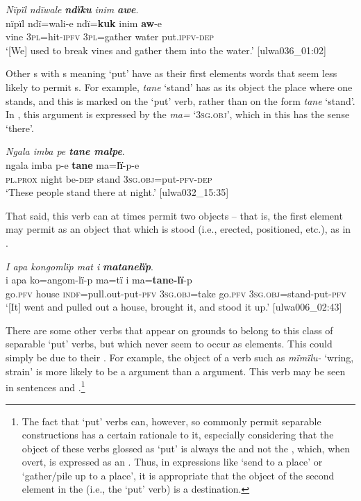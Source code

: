 \ea%
    \label{ex:phrase:83}
         \textit{Nïpïl ndïwale} \textbf{\textit{ndïku}} \textit{inim} \textbf{\textit{awe}}.\\
\gll nïpïl  ndï=wali-e    ndï=\textbf{kuk}    inim  \textbf{aw}{}-e\\
    vine  3\textsc{pl}=hit-\textsc{ipfv}  3\textsc{pl}=gather  water  put.\textsc{ipfv-dep}\\
\glt `[We] used to break vines and gather them into the water.’ [ulwa036\_01:02]
\z

Other s with s meaning ‘put’ have as their first elements words that seem less likely to permit s. For example, \textit{tane} ‘stand’ has as its object the place where one stands, and this is marked on the ‘put’ verb, rather than on the form \textit{tane} ‘stand’. In , this  argument is expressed by the   \textit{ma=} ‘\textsc{3sg.obj}’, which in this  has the sense ‘there’.

\ea%
    \label{ex:phrase:84}
          \textit{Ngala imba pe \textbf{tane malpe}}.\\
\gll ngala    imba  p-e    \textbf{tane}  ma=\textbf{lï}{}-p-e\\
    \textsc{pl.prox}  night  be\textsc{{}-dep} stand  3\textsc{sg.obj}=put-\textsc{pfv-dep}\\
\glt `These people stand there at night.’ [ulwa032\_15:35]
\z

That said, this verb can at times permit two objects -- that is, the first element may permit as an object that which is stood (i.e., erected, positioned, etc.), as in .

\ea%
    \label{ex:phrase:85}
          \textit{I apa kongomlïp mat i} \textbf{\textit{matanelïp}}.\\
\gll i    apa    ko=angom-lï-p      ma=tï      i     ma=\textbf{tane-lï}{}-p\\
    go.\textsc{pfv}  house  \textsc{indf}=pull.out-put-\textsc{pfv}  3\textsc{sg.obj}=take  go.\textsc{pfv}    \textsc{3sg.obj=}stand-put-\textsc{pfv}\\
\glt `[It] went and pulled out a house, brought it, and stood it up.’ [ulwa006\_02:43]
\z

There are some other verbs that appear on  grounds to belong to this class of separable ‘put’ verbs, but which never seem to occur as  elements. This could simply be due to their . For example, the object of a verb such as \textit{mïmïlu-} ‘wring, strain’ is more likely to be a  argument than a  argument. This verb may be seen in sentences  and .\footnote{The fact that ‘put’ verbs can, however, so commonly permit separable constructions has a certain rationale to it, especially considering that the object of these verbs glossed as ‘put’ is always the  and not the , which, when overt, is expressed as an  . Thus, in expressions like ‘send to a place’ or ‘gather/pile up to a place’, it is appropriate that the object of the second element in the  (i.e., the ‘put’ verb) is a destination.}

